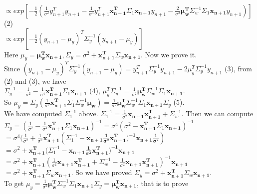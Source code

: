 \documentclass{article}
\begin{document}
$\propto exp[- \frac{1}{2}(\frac{1}{\sigma^2}y_{n+1}^T y_{n+1} - \frac{1}{\sigma^4} y_{n+1}^T \mathbf{x_{n+1}^T} \Sigma_1 \mathbf{x_{n+1}}y_{n+1} - \frac{2}{\sigma^2} \mathbf{\mu_w ^T}\Sigma_w^{-1} \Sigma_1 \mathbf{x_{n+1}}y_{n+1})]$ (2)\\
$\propto exp[-\frac{1}{2}(y_{n+1}-\mu_y)^T \Sigma_{y}^{-1}(y_{n+1}-\mu_y)]$\\
Here $\mu_y = \mathbf{\mu_w^T x_{n+1}},\Sigma_y = \sigma^2 +\mathbf{x_{n+1}^T} \Sigma_w \mathbf{x_{n+1}}$. Now we prove it.\\
Since $(y_{n+1}-\mu_y)^T \Sigma_{y}^{-1}(y_{n+1}-\mu_y) = y_{n+1}^T \Sigma_y^{-1}y_{n+1} - 2 \mu_y^T \Sigma_y^{-1} y_{n+1}$ (3),
 from (2) and (3), we have\\
$\Sigma_y^{-1} = \frac{1}{\sigma^2} - \frac{1}{\sigma^4}\mathbf{x_{n+1}^T} \Sigma_1\mathbf{x_{n+1}}$ (4), 
$\mu_y^T \Sigma_y^{-1} = \frac{1}{\sigma^2} \mathbf{\mu_w ^T}\Sigma_w^{-1} \Sigma_1 \mathbf{x_{n+1}}$. \\
So $\mu_y = \Sigma_y (\frac{1}{\sigma^2} \mathbf{x_{n+1}^T} \Sigma_1 \Sigma_w^{-1} \mathbf{\mu_w}) = \frac{1}{\sigma^2} \mathbf{\mu_w^T} \Sigma_w^{-1} \Sigma_1 \mathbf{x_{n+1}} \Sigma_y$ (5).\\
We have computed $\Sigma_1^{-1}$ above. $\Sigma_1^{-1} = \frac{1}{\sigma^2}\mathbf{x_{n+1}x_{n+1}^T} + \Sigma_{w}^{-1}$. Then we can compute\\
$\Sigma_y = (\frac{1}{\sigma^2} - \frac{1}{\sigma^4}\mathbf{x_{n+1}^T} \Sigma_1\mathbf{x_{n+1}})^{-1} = \sigma^4 (\sigma^2 - \mathbf{x_{n+1}^T} \Sigma_1\mathbf{x_{n+1}})^{-1}$\\
$= \sigma^4 (\frac{1}{\sigma^2} +
 \frac{1}{\sigma^2} \mathbf{x_{n+1}^T}(\Sigma_1^{-1}-\mathbf{x_{n+1} \frac{1}{\sigma^2} \mathbf{x_{n+1}^T})^{-1}} \mathbf{x_{n+1} \frac{1}{\sigma^2}})$\\
 $ = \sigma^2 + \mathbf{x_{n+1}^T}(\Sigma_1^{-1}-\mathbf{x_{n+1} \frac{1}{\sigma^2} \mathbf{x_{n+1}^T})^{-1}} \mathbf{x_{n+1}}$\\
 $ = \sigma^2 + \mathbf{x_{n+1}^T}(\frac{1}{\sigma^2}\mathbf{x_{n+1}x_{n+1}^T} + \Sigma_{w}^{-1}-\frac{1}{\sigma^2}\mathbf{x_{n+1}x_{n+1}^T})^{-1} \mathbf{x_{n+1}}$\\
 $ = \sigma^2 +\mathbf{x_{n+1}^T} \Sigma_w \mathbf{x_{n+1}}$. So we have proved $\Sigma_y = \sigma^2 +\mathbf{x_{n+1}^T} \Sigma_w \mathbf{x_{n+1}}$.\\
 To get $\mu_y = \frac{1}{\sigma^2} \mathbf{\mu_w^T} \Sigma_w^{-1} \Sigma_1 \mathbf{x_{n+1}} \Sigma_y = \mathbf{\mu_w^T x_{n+1}}$, that is to prove \\
\end{document}
